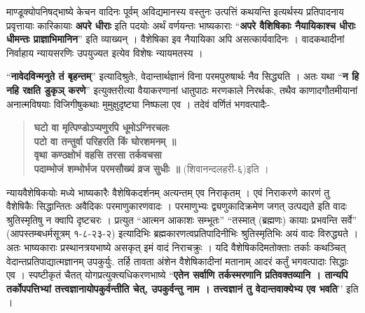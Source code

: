 {माण्डूक्योपनिषद्भाष्ये केचन वादिनः पूर्वम् अविद्यमानस्य वस्तुनः उत्पत्तिं कथयन्ति इत्यर्थस्य प्रतिपादनाय प्रवृत्तायाः कारिकायाः \textbf{अपरे धीराः} इति पदयोः अर्थं वर्णयन्तः भाष्यकाराः “\textbf{अपरे वैशिषिकाः नैयायिकाश्च धीराः धीमन्तः प्राज्ञाभिमानिन}” इति व्याख्यन् । वैशेषिका इव नैयायिका अपि असत्कार्यवादिनः । वादकथादीनां निर्वाहाय न्यायसरणिः उपयुज्यत इत्येव विशेषः न्यायमतस्य ।

“\textbf{नावेदविन्मनुते तं बृहन्तम्}” इत्यादिश्रुतेः, वेदान्तार्थज्ञानं विना परमपुरुषार्थः नैव सिद्ध्यति । अतः यथा “\textbf{न हि नहि रक्षति डुकृञ् करणे}” इत्युक्तरीत्या वैयाकरणानां धातुपाठः मरणकाले निरर्थकः, तथैव काणादगौतमीयानां अनात्मविषयाः विजिगीषुकथाः मुमुक्षुदृष्ट्या निष्फला एव । तदेवं वर्णितं भगवत्पादैः-
\begin{verse}
\textbf{घटो वा मृत्पिण्डोऽप्यणुरपि धूमोऽग्निरचलः\\
पटो वा तन्तुर्वा परिहरति किं घोरशमनम् ॥\\
वृथा कण्ठक्षोभं वहसि तरसा तर्कवचसा\\
पदाम्भोजं शम्भोर्भज परमसौख्यं व्रज सुधीः ॥} (शिवानन्दलहरी-६)इति ।
\end{verse}
न्यायवैशेषिकयोः मध्ये भाष्यकारैः वैशेषिकदर्शनम् अत्यन्तम् एव निराकृतम् । एवं निराकरणे कारणं तु वैशेषिकैः सिद्धान्तितः अवैदिकः परमाणुकारणवादः । परमाणुभ्यः द्व्यणुकादिक्रमेण जगत् उत्पद्यते इति वादः श्रुतिस्मृतिषु न क्वापि दृष्टचरः । प्रत्युत “आत्मन आकाशः सम्भूतः” “तस्मात् (ब्रह्मणः) कायाः प्रभवन्ति सर्वे” (आपस्तम्बधर्मसूत्रम् १-८-२३-२) इत्यादिभिः ब्रह्मकारणत्वप्रतिपादिनीभिः श्रुतिस्मृतिभिः अयं वादः विरुद्ध्यते । अतः भाष्यकाराः प्रस्थानत्रयभाष्ये असकृत् इमं वादं निराचक्रुः । यदि वैशेषिकदिमतोक्ताः तर्काः कथञ्चित् वेदान्तप्रतिपाद्यात्मज्ञानम् उपकुर्युः. तर्हि तावता अंशेन वैशेषिकादीनां मतानाम् आदरं कर्तुं भगवत्पादाः सिद्धाः एव । स्पष्टीकृतं चैतत् योगप्रत्युक्त्यधिकरणभाष्ये “\textbf{एतेन सर्वाणि तर्कस्मरणानि प्रतिवक्तव्यानि । तान्यपि तर्कोपपत्तिभ्यां तत्त्वज्ञानायोपकुर्वन्तीति चेत्, उपकुर्वन्तु नाम । तत्त्वज्ञानं तु वेदान्तवाक्येभ्य एव भवति}’’ इति ।

\articleend
}

